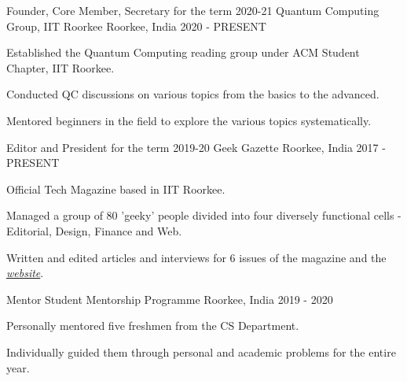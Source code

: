 

\begin{cventries}
  \cventry
    {Founder, Core Member, Secretary for the term 2020-21} %
    {Quantum Computing Group, IIT Roorkee} %
    {Roorkee, India} %
    {2020 - PRESENT} %
    {
      \begin{cvitems} %
        \item {Established the Quantum Computing reading group under ACM Student Chapter, IIT Roorkee.}
        \item {Conducted QC discussions on various topics from the basics to the advanced.}
        \item {Mentored beginners in the field to explore the various topics systematically.}
    \end{cvitems}
    }

  \cventry
    {Editor and President for the term 2019-20} %
    {Geek Gazette} %
    {Roorkee, India} %
    {2017 - PRESENT} %
    {
      \begin{cvitems} %
        \item {Official Tech Magazine based in IIT Roorkee.}
        \item {Managed a group of 80 'geeky' people divided into four diversely functional cells - Editorial, Design, Finance and Web.}
        \item {Written and edited articles and interviews for 6 issues of the magazine and the \emph{\href{https://geekgazette.iitr.ac.in}{website}}.}
      \end{cvitems}
    }

  \cventry
    {Mentor} %
    {Student Mentorship Programme} %
    {Roorkee, India} %
    {2019 - 2020} %
    {
      \begin{cvitems} %
        \item {Personally mentored five freshmen from the CS Department.}
        \item {Individually guided them through personal and academic problems for the entire year.}
      \end{cvitems}
    }


\end{cventries}
